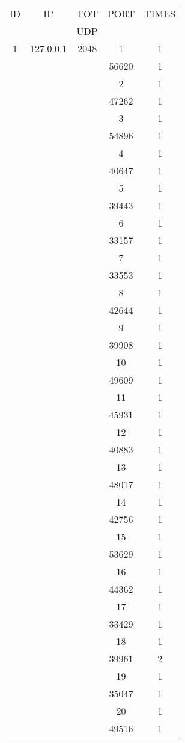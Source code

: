 \documentclass[a4paper]{scrartcl}
\begin{document}
\noindent\begin{minipage}[b]{0.5\linewidth}\begin{tabular}{| c | c | c | c | c |}
\hline
ID & IP & TOT & PORT & TIMES \\ 
   &    & UDP &      &       \\ 
\hline
1 & 127.0.0.1 & 2048 & 1 & 1 \\ 
& & & 56620 & 1 \\ & & & 2 & 1 \\ & & & 47262 & 1 \\ & & & 3 & 1 \\ & & & 54896 & 1 \\ & & & 4 & 1 \\ & & & 40647 & 1 \\ & & & 5 & 1 \\ & & & 39443 & 1 \\ & & & 6 & 1 \\ & & & 33157 & 1 \\ & & & 7 & 1 \\ & & & 33553 & 1 \\ & & & 8 & 1 \\ & & & 42644 & 1 \\ & & & 9 & 1 \\ & & & 39908 & 1 \\ & & & 10 & 1 \\ & & & 49609 & 1 \\ & & & 11 & 1 \\ & & & 45931 & 1 \\ & & & 12 & 1 \\ & & & 40883 & 1 \\ & & & 13 & 1 \\ & & & 48017 & 1 \\ & & & 14 & 1 \\ & & & 42756 & 1 \\ & & & 15 & 1 \\ & & & 53629 & 1 \\ & & & 16 & 1 \\ & & & 44362 & 1 \\ & & & 17 & 1 \\ & & & 33429 & 1 \\ & & & 18 & 1 \\ & & & 39961 & 2 \\ & & & 19 & 1 \\ & & & 35047 & 1 \\ & & & 20 & 1 \\ & & & 49516 & 1 \\ \hline\end{tabular}\end{minipage} \hfill\begin{minipage}[b]{0.5\linewidth}\begin{tabular}{| c | c | c | c | c |}

\end{tabular}
\end{minipage}
\end{document}
